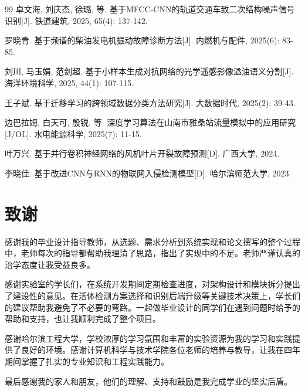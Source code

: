 \documentclass{heuthesis}
\begin{document}
\begin{thebibliography}{99}
卓文海, 刘庆杰, 徐璐, 等. 基于MFCC-CNN的轨道交通车致二次结构噪声信号识别[J]. 铁道建筑, 2025, 65(4): 137-142.

罗晓青. 基于频谱的柴油发电机振动故障诊断方法[J]. 内燃机与配件, 2025(6): 83-85.

刘川, 马玉娟, 范剑超. 基于小样本生成对抗网络的光学遥感影像溢油语义分割[J]. 海洋环境科学, 2025, 44(1): 107-115.

王子斌. 基于迁移学习的跨领域数据分类方法研究[J]. 大数据时代, 2025(2): 39-43.

边巴拉姆, 白天可, 殷锐, 等. 深度学习算法在山南市雅桑站流量模拟中的应用研究[J/OL]. 水电能源科学, 2025(7): 11-15.

叶万兴. 基于并行卷积神经网络的风机叶片开裂故障预测[D]. 广西大学, 2024.

李晓佳. 基于改进CNN与RNN的物联网入侵检测模型[D]. 哈尔滨师范大学, 2023.

\end{thebibliography}

\clearpage
\section*{\centering{}致\quad 谢}

感谢我的毕业设计指导教师，从选题、需求分析到系统实现和论文撰写的整个过程中，老师每次的指导都帮助我理清了思路，指出了实现中的不足。老师严谨认真的治学态度让我受益良多。

感谢实验室的学长们，在系统开发期间定期检查进度，对架构设计和模块拆分提出了建设性的意见。在活体检测方案选择和识别后端升级等关键技术决策上，学长们的建议帮助我避免了不必要的弯路。一起做毕业设计的同学们在遇到问题时给予的帮助和支持，也让我顺利完成了整个项目。

感谢哈尔滨工程大学，学校浓厚的学习氛围和丰富的实验资源为我的学习和实践提供了良好的环境。感谢计算机科学与技术学院各位老师的培养与教导，让我在四年期间掌握了扎实的专业知识和工程实践能力。

最后感谢我的家人和朋友，他们的理解、支持和鼓励是我完成学业的坚实后盾。
\end{document}
